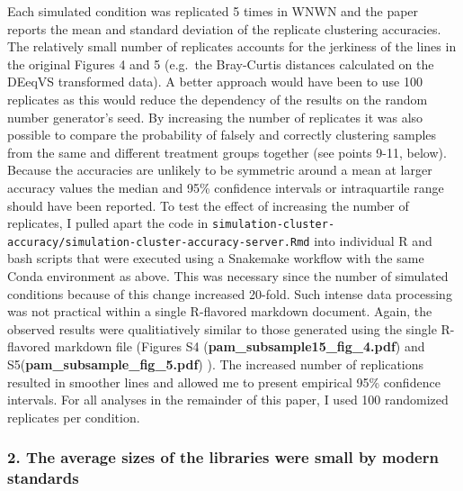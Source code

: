 \documentclass[
]{article}
\begin{document}
Each simulated condition was replicated 5 times in WNWN and the paper
reports the mean and standard deviation of the replicate clustering
accuracies. The relatively small number of replicates accounts for the
jerkiness of the lines in the original Figures 4 and 5 (e.g.~the
Bray-Curtis distances calculated on the DEeqVS transformed data). A
better approach would have been to use 100 replicates as this would
reduce the dependency of the results on the random number generator's
seed. By increasing the number of replicates it was also possible to
compare the probability of falsely and correctly clustering samples from
the same and different treatment groups together (see points 9-11,
below). Because the accuracies are unlikely to be symmetric around a
mean at larger accuracy values the median and 95\% confidence intervals
or intraquartile range should have been reported. To test the effect of
increasing the number of replicates, I pulled apart the code in
\texttt{simulation-cluster-accuracy/simulation-cluster-accuracy-server.Rmd}
into individual R and bash scripts that were executed using a Snakemake
workflow with the same Conda environment as above. This was necessary
since the number of simulated conditions because of this change
increased 20-fold. Such intense data processing was not practical within
a single R-flavored markdown document. Again, the observed results were
qualitiatively similar to those generated using the single R-flavored
markdown file (Figures S4 (\textbf{pam\_subsample15\_fig\_4.pdf}) and
S5(\textbf{pam\_subsample\_fig\_5.pdf}) ). The increased number of
replications resulted in smoother lines and allowed me to present
empirical 95\% confidence intervals. For all analyses in the remainder
of this paper, I used 100 randomized replicates per condition.

\hypertarget{the-average-sizes-of-the-libraries-were-small-by-modern-standards}{%
\subsubsection{2. The average sizes of the libraries were small by
modern
standards}\label{the-average-sizes-of-the-libraries-were-small-by-modern-standards}}
\end{document}
